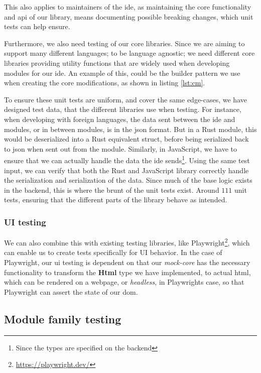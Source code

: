 This also applies to maintainers of the \gls*{ide}, as maintaining the core
functionality and \gls*{api} of our library, means documenting possible breaking
changes, which unit tests can help ensure.

Furthermore, we also need testing of our core libraries. Since we are aiming to
support many different languages; to be language agnostic; we need different core
libraries providing utility functions that are widely used when developing
modules for our \gls{ide}. An example of this, could be the builder pattern we
use when creating the core modifications, as shown in listing \ref{lst:cm}.

To ensure these unit tests are uniform, and cover the same edge-cases, we have
designed test data, that the different libraries use when testing. For instance,
when developing with foreign languages, the data sent between the \gls{ide} and
modules, or in between modules, is in the \gls{json} format. But in a Rust
module, this would be deserialized into a Rust equivalent struct, before being
serialized back to \gls{json} when sent out from the module. Similarly, in
JavaScript, we have to ensure that we can actually handle the data the \gls{ide}
sends\footnote{Since the types are specified on the backend}. Using the same
test input, we can verify that both the Rust and JavaScript library correctly
handle the serialization and serialization of the data. Since much of the base
logic exists in the backend, this is where the brunt of the unit tests exist.
Around $111$ unit tests, ensuring that the different parts of the library
behave as intended.


\subsubsection{UI testing}

We can also combine this with existing testing libraries, like Playwright\footnote{\url{https://playwright.dev/}},
which can enable us to create tests specifically for UI behavior. In the case of
Playwright, our \gls*{ui} testing is dependent on that our \textit{mock-core}
has the necessary functionality to transform the \textbf{Html} type we have
implemented, to actual \gls*{html}, which can be rendered on a webpage, or
\textit{headless}, in Playwrights case, so that Playwright can assert the state
of our \gls*{dom}.


\subsection{Module family testing}

